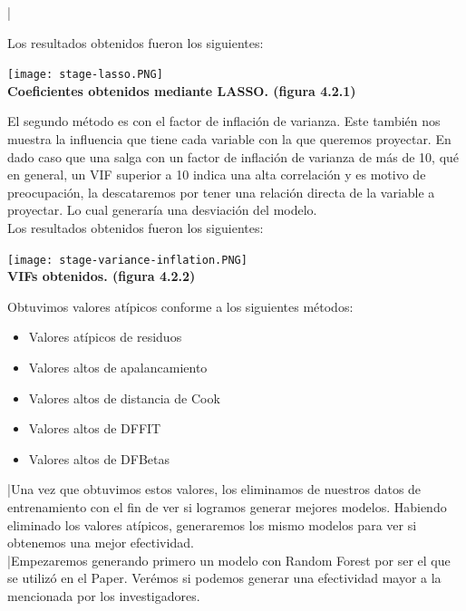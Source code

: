 |\documentclass{article}
\begin{document}
Los resultados obtenidos fueron los siguientes:\\

\begin{center}
        \texttt{[image: stage-lasso.PNG]} \\
        \textbf{Coeficientes obtenidos mediante LASSO. (figura 4.2.1)}
\end{center}

El segundo método es con el factor de inflación de varianza. Este también nos muestra la influencia que tiene cada variable con la que queremos proyectar. En dado caso que una salga con un factor de inflación de varianza de más de 10, qué en general, un VIF superior a 10 indica una alta correlación y es motivo de preocupación, la descataremos por tener una relación directa de la variable a proyectar. Lo cual generaría una desviación del modelo.\\

Los resultados obtenidos fueron los siguientes:\\

\begin{center}
        \texttt{[image: stage-variance-inflation.PNG]} \\
        \textbf{VIFs obtenidos. (figura 4.2.2)}
\end{center}

Obtuvimos valores atípicos conforme a los siguientes métodos:

            \begin{itemize}
                \item Valores atípicos de residuos
                \item Valores altos de apalancamiento
                \item Valores altos de distancia de Cook
                \item Valores altos de DFFIT
                \item  Valores altos de DFBetas 
            \end{itemize}
   

|Una vez que obtuvimos estos valores, los eliminamos de nuestros datos de entrenamiento con el fin de ver si logramos generar mejores modelos. Habiendo eliminado los valores atípicos, generaremos los mismo modelos para ver si obtenemos una mejor efectividad.\\

|Empezaremos generando primero un modelo con Random Forest por ser el que se utilizó en el Paper. Verémos si podemos generar una efectividad mayor a la mencionada por los investigadores.\\
\end{document}
